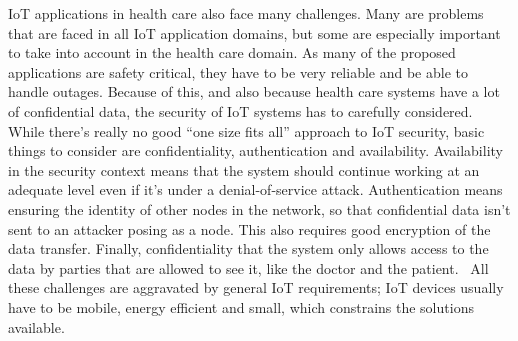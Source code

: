 IoT applications in health care also face many challenges. Many are problems
that are faced in all IoT application domains, but some are especially
important to take into account in the health care domain. As many of the
proposed applications are safety critical, they have to be very reliable and be
able to handle outages. Because of this, and also because health care systems
have a lot of confidential data, the security of IoT systems has to carefully
considered. While there's really no good ``one size fits all'' approach to IoT
security, basic things to consider are confidentiality, authentication and
availability. Availability in the security context means that the system should
continue working at an adequate level even if it's under a denial-of-service
attack. Authentication means ensuring the identity of other nodes in the
network, so that confidential data isn't sent to an attacker posing as a node.
This also requires good encryption of the data transfer. Finally,
confidentiality that the system only allows access to the data by parties that
are allowed to see it, like the doctor and the patient.~\cite{Islam2015} All
these challenges are aggravated by general IoT requirements; IoT devices
usually have to be mobile, energy efficient and small, which constrains the
solutions available.























